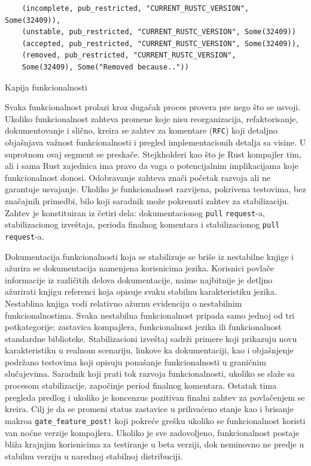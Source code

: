 \documentclass[11pt]{article}
\begin{document}
\begin{listing}[H]
\begin{verbatim}
    (incomplete, pub_restricted, "CURRENT_RUSTC_VERSION", Some(32409)),
    (unstable, pub_restricted, "CURRENT_RUSTC_VERSION", Some(32409))
    (accepted, pub_restricted, "CURRENT_RUSTC_VERSION", Some(32409)),
    (removed, pub_restricted, "CURRENT_RUSTC_VERSION", 
    Some(32409), Some("Removed because.."))
\end{verbatim}
\caption{Kapija funkcionalnosti}
\label{lst:rustup_set}
\end{listing}

Svaka funkcionalnost prolazi kroz dugačak proces provera pre nego 
što se usvoji. Ukoliko funkcionalnost zahteva promene koje nisu reorganizacija, refaktorisanje, dokumentovanje
i slično, kreira se zahtev za komentare (\verb|RFC|) koji detaljno objašnjava važnost funkcionalnosti i 
pregled implementacionih detalja sa visine. U suprotnom ovaj segment se preskače. Stejkholderi kao što je Rust kompajler tim, ali i sama Rust zajednica 
ima pravo da vaga o potencijalnim implikacijama koje funkcionalnost donosi. Odobravanje zahteva znači početak 
razvoja ali ne garantuje usvajanje. Ukoliko je funkcionalnost razvijena, pokrivena testovima, 
bez značajnih primedbi, bilo koji saradnik može pokrenuti zahtev za stabilizaciju. Zahtev je konstituiran iz 
četiri dela: dokumentacionog \verb|pull| \verb|request|-a, stabilizacionog izveštaja, 
perioda finalnog komentara i stabilizacionog \verb|pull| \verb|request|-a.

Dokumentacija funkcionalnosti koja se stabilizuje se briše iz nestabilne knjige \cite{unstable} i ažurira se 
dokumentacija namenjena korisnicima jezika. Korisnici povlače informacije iz različitih delova dokumentacije,
naime najbitnije je detljno ažurirati knjigu referenci \cite{rust-reference} koja opisuje svaku stabilnu 
karakteristiku jezika. Nestablina knjiga vodi relativno ažurnu evidenciju o nestabilnim funkcionalnostima.
Svaka nestabilna funkcionalnost pripada samo jednoj od tri potkategorije: zastavica kompajlera, funkcionalnost jezika ili
funkcionalnost standardne biblioteke. Stabilizacioni izveštaj sadrži primere koji prikazuju novu karakteristiku 
u realnom scenariju, linkove ka dokumentaciji, kao i objašnjenje podržano testovima koji opisuju ponašanje funkcionalnosti u 
graničnim slučajevima. Saradnik koji prati tok razvoja funkcionalnosti, ukoliko se slaže sa procesom 
stabilizacije, započinje period finalnog komentara. Ostatak tima pregleda predlog i ukoliko je koncenzus
pozitivan finalni zahtev za povlačenjem se kreira. Cilj je da se promeni status zastavice u prihvaćeno
stanje kao i brisanje makroa \verb|gate_feature_post!| koji pokreće grešku ukoliko se funkcionalnost koristi van noćne verzije kompajlera.
Ukoliko je sve zadovoljeno, funkcionalnost postaje bliža krajnjim korisnicima za testiranje u beta verziji, dok
neminovno ne predje u stabilnu verziju u narednoj stabilnoj distribuciji. 
\end{document}
